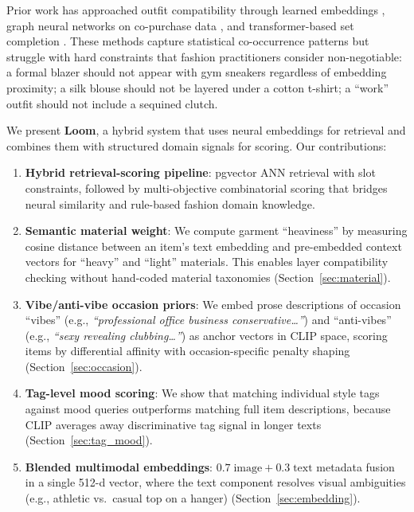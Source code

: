 \documentclass[10pt,twocolumn]{article}
\begin{document}
Prior work has approached outfit compatibility through learned embeddings
\citep{vasileva2018learning, chia2022fashionclip}, graph neural networks on
co-purchase data \citep{cui2019dressing}, and transformer-based set
completion \citep{sarkar2023outfittransformer}.  These methods capture
statistical co-occurrence patterns but struggle with hard constraints that
fashion practitioners consider non-negotiable: a formal blazer should not
appear with gym sneakers regardless of embedding proximity; a silk blouse
should not be layered under a cotton t-shirt; a ``work'' outfit should not
include a sequined clutch.

We present \textbf{Loom}, a hybrid system that uses neural embeddings for
retrieval and combines them with structured domain signals for scoring.  Our
contributions:

\begin{enumerate}[leftmargin=*,topsep=2pt,itemsep=1pt]
\item \textbf{Hybrid retrieval-scoring pipeline}: pgvector ANN retrieval
  with slot constraints, followed by multi-objective combinatorial scoring
  that bridges neural similarity and rule-based fashion domain knowledge.

\item \textbf{Semantic material weight}: We compute garment ``heaviness''
  by measuring cosine distance between an item's text embedding and
  pre-embedded context vectors for ``heavy'' and ``light'' materials.  This
  enables layer compatibility checking without hand-coded material
  taxonomies (Section~\ref{sec:material}).

\item \textbf{Vibe/anti-vibe occasion priors}: We embed prose descriptions
  of occasion ``vibes'' (e.g., \emph{``professional office business
  conservative\ldots''}) and ``anti-vibes'' (e.g., \emph{``sexy revealing
  clubbing\ldots''}) as anchor vectors in CLIP space, scoring items by
  differential affinity with occasion-specific penalty shaping
  (Section~\ref{sec:occasion}).

\item \textbf{Tag-level mood scoring}: We show that matching individual
  style tags against mood queries outperforms matching full item
  descriptions, because CLIP averages away discriminative tag signal in
  longer texts (Section~\ref{sec:tag_mood}).

\item \textbf{Blended multimodal embeddings}: $0.7\;\text{image} +
  0.3\;\text{text}$ metadata fusion in a single 512-d vector, where the
  text component resolves visual ambiguities (e.g., athletic vs.\ casual top
  on a hanger) (Section~\ref{sec:embedding}).
\end{enumerate}
\end{document}
